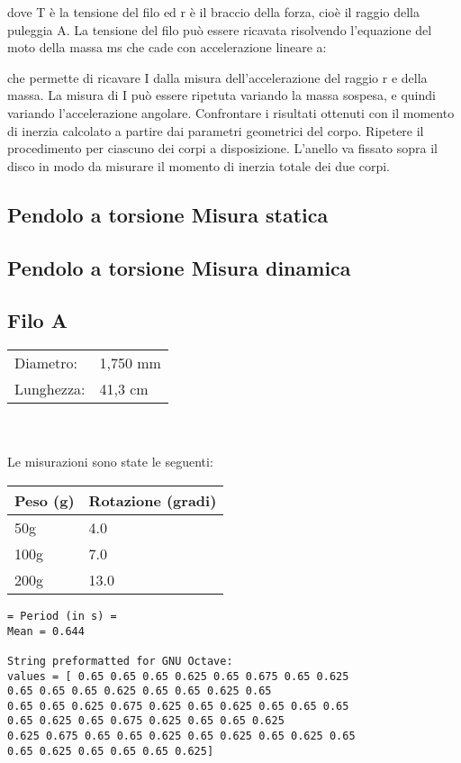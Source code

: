 \documentclass[a4paper,10pt]{report}
\begin{document}
dove T è la tensione del filo ed r è il braccio della forza, cioè il raggio della puleggia A. La tensione del filo può essere ricavata risolvendo l’equazione del moto della massa ms che cade con accelerazione lineare a:

che permette di ricavare I dalla misura dell’accelerazione  del raggio r e della massa. La misura di I può essere ripetuta variando la massa sospesa, e quindi variando l'accelerazione angolare. Confrontare i risultati ottenuti con il momento di inerzia calcolato a partire dai parametri geometrici del corpo.
Ripetere il procedimento per ciascuno dei corpi a disposizione. L’anello va fissato sopra il disco in modo da misurare il momento di inerzia totale dei due corpi.

\subsection{Pendolo a torsione Misura statica}

\subsection{Pendolo a torsione Misura dinamica}

\subsection{Filo A}
\begin{tabular}{ll}
Diametro: & 1,750 mm\\
Lunghezza: & 41,3 cm\\
\end{tabular}
\\ \\
Le misurazioni sono state le seguenti:
\begin{center}
\begin{tabular}{|l|l|}
\toprule
Peso (g) & Rotazione (gradi)\\
\midrule
50g & 4.0 \\
100g & 7.0 \\
200g & 13.0 \\
\bottomrule
\end{tabular}
\end{center}

\begin{verbatim}
= Period (in s) =
Mean = 0.644

String preformatted for GNU Octave:
values = [ 0.65 0.65 0.65 0.625 0.65 0.675 0.65 0.625
0.65 0.65 0.65 0.625 0.65 0.65 0.625 0.65
0.65 0.65 0.625 0.675 0.625 0.65 0.625 0.65 0.65 0.65
0.65 0.625 0.65 0.675 0.625 0.65 0.65 0.625
0.625 0.675 0.65 0.65 0.625 0.65 0.625 0.65 0.625 0.65
0.65 0.625 0.65 0.65 0.65 0.625]
\end{verbatim}
\end{document}
